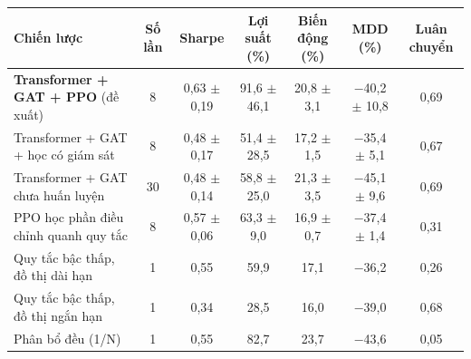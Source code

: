 \begin{tabular}{@{}lcccccc@{}}
\toprule
Chiến lược & Số lần & Sharpe & Lợi suất (\%) & Biến động (\%) & MDD (\%) & Luân chuyển \\
\midrule
\textbf{Transformer + GAT + PPO} (đề xuất) & 8 & 0{,}63 $\pm$ 0{,}19 & 91{,}6 $\pm$ 46{,}1 & 20{,}8 $\pm$ 3{,}1 & $-$40{,}2 $\pm$ 10{,}8 & 0{,}69 \\
Transformer + GAT + học có giám sát & 8 & 0{,}48 $\pm$ 0{,}17 & 51{,}4 $\pm$ 28{,}5 & 17{,}2 $\pm$ 1{,}5 & $-$35{,}4 $\pm$ 5{,}1 & 0{,}67 \\
Transformer + GAT chưa huấn luyện & 30 & 0{,}48 $\pm$ 0{,}14 & 58{,}8 $\pm$ 25{,}0 & 21{,}3 $\pm$ 3{,}5 & $-$45{,}1 $\pm$ 9{,}6 & 0{,}69 \\
PPO học phần điều chỉnh quanh quy tắc & 8 & 0{,}57 $\pm$ 0{,}06 & 63{,}3 $\pm$ 9{,}0 & 16{,}9 $\pm$ 0{,}7 & $-$37{,}4 $\pm$ 1{,}4 & 0{,}31 \\
Quy tắc bậc thấp, đồ thị dài hạn & 1 & 0{,}55 & 59{,}9 & 17{,}1 & $-$36{,}2 & 0{,}26 \\
Quy tắc bậc thấp, đồ thị ngắn hạn & 1 & 0{,}34 & 28{,}5 & 16{,}0 & $-$39{,}0 & 0{,}68 \\
Phân bổ đều (1/N) & 1 & 0{,}55 & 82{,}7 & 23{,}7 & $-$43{,}6 & 0{,}05 \\
\bottomrule
\end{tabular}
